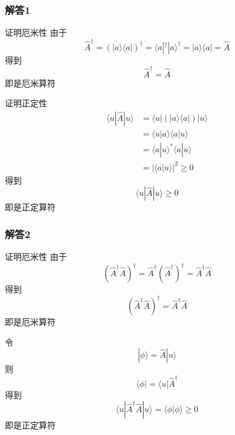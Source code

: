 \subsubsection{解答1}
证明厄米性
由于
\begin{equation}
    \hat{A}^{\dagger}=\left( |a\rangle \langle a| \right) ^{\dagger}=\langle a|^{\dagger}|a\rangle ^{\dagger}=|a\rangle \langle a|=\hat{A}
\end{equation}
得到
\begin{equation}
    \hat{A}^{\dagger}=\hat{A}
\end{equation}
即是厄米算符

证明正定性
\begin{equation}
    \begin{aligned}
        \langle u|\hat{A}|u\rangle &=\langle u|\left( |a\rangle \langle a| \right) |u\rangle 
\\
&=\langle u|a\rangle \langle a|u\rangle 
\\
&=\langle a|u\rangle ^*\langle a|u\rangle 
\\
&=\left| \langle a|u\rangle \right|^2\geqslant 0
    \end{aligned}
\end{equation}
得到
\begin{equation}
    \langle u|\hat{A}|u\rangle \geqslant 0
\end{equation}
即是正定算符

\subsubsection{解答2}
证明厄米性
由于
\begin{equation}
    \left( \hat{A}^{\dagger}\hat{A} \right) ^{\dagger}=\hat{A}^{\dagger}\left( \hat{A}^{\dagger} \right) ^{\dagger}=\hat{A}^{\dagger}\hat{A}
\end{equation}
得到
\begin{equation}
    \left( \hat{A}^{\dagger}\hat{A} \right) ^{\dagger}=\hat{A}^{\dagger}\hat{A}
\end{equation}
即是厄米算符

令
\begin{equation}
    |\phi \rangle =\hat{A}|u\rangle 
\end{equation}
则
\begin{equation}
    \langle \phi |=\langle u|\hat{A}^{\dagger}
\end{equation}
得到
\begin{equation}
    \langle u|\hat{A}^{\dagger}\hat{A}|u\rangle =\langle \phi |\phi \rangle \geqslant 0
\end{equation}
即是正定算符


